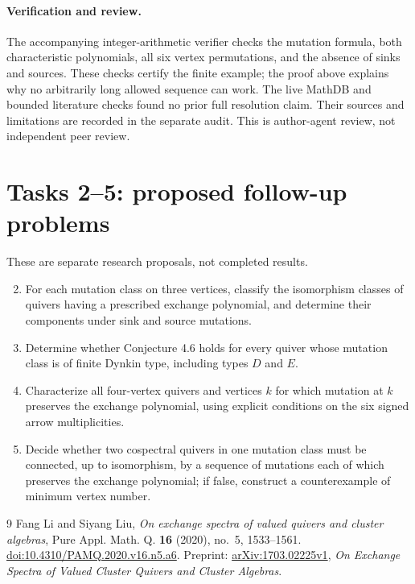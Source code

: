 \documentclass[11pt]{article}
\begin{document}
\paragraph{Verification and review.}
The accompanying integer-arithmetic verifier checks the mutation
formula, both characteristic polynomials, all six vertex permutations,
and the absence of sinks and sources. These checks certify the finite
example; the proof above explains why no arbitrarily long allowed
sequence can work. The live MathDB and bounded literature checks
found no prior full resolution claim. Their sources and limitations
are recorded in the separate audit. This is author-agent review,
not independent peer review.

\section*{Tasks 2--5: proposed follow-up problems}
These are separate research proposals, not completed results.
\begin{enumerate}
\setcounter{enumi}{1}
\item For each mutation class on three vertices, classify the
isomorphism classes of quivers having a prescribed exchange polynomial,
and determine their components under sink and source mutations.
\item Determine whether Conjecture 4.6 holds for every quiver whose
mutation class is of finite Dynkin type, including types $D$ and $E$.
\item Characterize all four-vertex quivers and vertices $k$ for which
mutation at $k$ preserves the exchange polynomial, using explicit
conditions on the six signed arrow multiplicities.
\item Decide whether two cospectral quivers in one mutation class must
be connected, up to isomorphism, by a sequence of mutations each of
which preserves the exchange polynomial; if false, construct a
counterexample of minimum vertex number.
\end{enumerate}

\begin{thebibliography}{9}
 Fang Li and Siyang Liu,
\emph{On exchange spectra of valued quivers and cluster algebras},
Pure Appl. Math. Q. \textbf{16} (2020), no.~5, 1533--1561.
\href{https://doi.org/10.4310/PAMQ.2020.v16.n5.a6}{doi:10.4310/PAMQ.2020.v16.n5.a6}.
Preprint: \href{https://arxiv.org/abs/1703.02225}{arXiv:1703.02225v1},
\emph{On Exchange Spectra of Valued Cluster Quivers and Cluster Algebras}.
\end{thebibliography}
\end{document}

